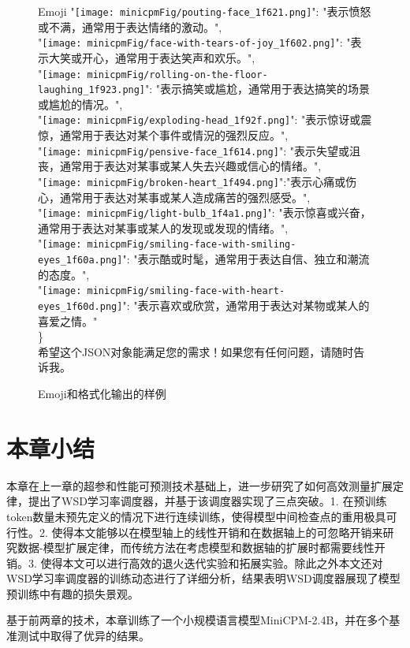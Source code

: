 \begin{figure}[hbp]
{\begin{AIbox}{Emoji}
{{    "\texttt{[image: minicpmFig/pouting-face\_1f621.png]}": "表示愤怒或不满，通常用于表达情绪的激动。", \\
    "\texttt{[image: minicpmFig/face-with-tears-of-joy\_1f602.png]}": "表示大笑或开心，通常用于表达笑声和欢乐。", \\
    "\texttt{[image: minicpmFig/rolling-on-the-floor-laughing\_1f923.png]}": "表示搞笑或尴尬，通常用于表达搞笑的场景或尴尬的情况。", \\
    "\texttt{[image: minicpmFig/exploding-head\_1f92f.png]}": "表示惊讶或震惊，通常用于表达对某个事件或情況的强烈反应。",\\
    "\texttt{[image: minicpmFig/pensive-face\_1f614.png]}": "表示失望或沮丧，通常用于表达对某事或某人失去兴趣或信心的情绪。", \\
    "\texttt{[image: minicpmFig/broken-heart\_1f494.png]}":"表示心痛或伤心，通常用于表达对某事或某人造成痛苦的强烈感受。", \\
    "\texttt{[image: minicpmFig/light-bulb\_1f4a1.png]}": "表示惊喜或兴奋，通常用于表达对某事或某人的发现或发现的情绪。",\\
    "\texttt{[image: minicpmFig/smiling-face-with-smiling-eyes\_1f60a.png]}": "表示酷或时髦，通常用于表达自信、独立和潮流的态度。",\\
    "\texttt{[image: minicpmFig/smiling-face-with-heart-eyes\_1f60d.png]}": "表示喜欢或欣赏，通常用于表达对某物或某人的喜爱之情。"\\
    \} \\
    希望这个JSON对象能满足您的需求！如果您有任何问题，请随时告诉我。}
    }
    \hspace{0.01\linewidth}
    \end{AIbox}
    }
    \caption{Emoji和格式化输出的样例}
    \label{fig:emoji}
    \end{figure}


\section{本章小结}
本章在上一章的超参和性能可预测技术基础上，进一步研究了如何高效测量扩展定律，提出了WSD学习率调度器，并基于该调度器实现了三点突破。1. 在预训练token数量未预先定义的情况下进行连续训练，使得模型中间检查点的重用极具可行性。2. 使得本文能够以在模型轴上的线性开销和在数据轴上的可忽略开销来研究数据-模型扩展定律，而传统方法在考虑模型和数据轴的扩展时都需要线性开销。3. 使得本文可以进行高效的退火迭代实验和拓展实验。除此之外本文还对WSD学习率调度器的训练动态进行了详细分析，结果表明WSD调度器展现了模型预训练中有趣的损失景观。

基于前两章的技术，本章训练了一个小规模语言模型MiniCPM-2.4B，并在多个基准测试中取得了优异的结果。